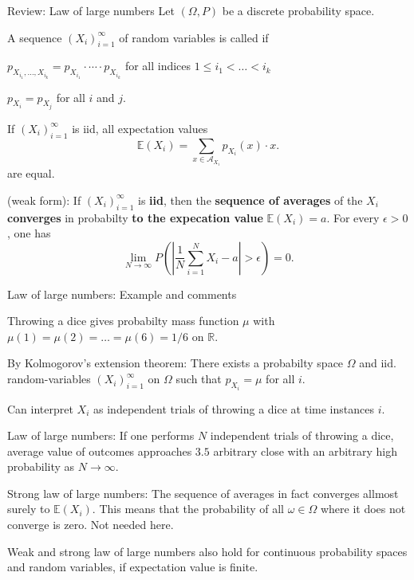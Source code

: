 \begin{frame}{Review: Law of large numbers}
Let $(\Omega,P)$ be a discrete probability space.
\bit
\item A sequence $(X_i)_{i=1}^\infty$ of random variables is called  if 
\bit
\item $p_{X_{i_1},\dots,X_{i_k}}=p_{X_{i_1}}\cdot \cdots \cdot p_{X_{i_k}} $ for all indices $1\leq i_1<\dots<i_k$
\item $p_{X_i}=p_{X_j}$ for all $i$ and $j$. 
\eit
\item  If $(X_i)_{i=1}^\infty$ is iid, all expectation values
\[
\mathbb{E}(X_i)=\sum_{x\in\mathcal{A}_{X_i}}p_{X_i}(x)\cdot x.
\]
are equal.   
\item {} (weak form): If $(X_i)_{i=1}^\infty$ is \textbf{iid}, then the \textbf{sequence 
of averages} of the $X_i$ \textbf{converges} in probabilty \textbf{to the expecation value} $\mathbb{E}(X_i)=a$.
For every $\epsilon>0$, one has 
\[
\lim_{N\to\infty}P\left(\left|\frac{1}{N}\sum_{i=1}^NX_i-a\right|>\epsilon\right)=0. 
\]
\eit 
\end{frame}

\begin{frame}{Law of large numbers: Example and comments}
\bit
\item Throwing a dice gives probabilty mass function $\mu$ with $\mu(1)=\mu(2)=\dots=\mu(6)=1/6$ on $\mathbb{R}$. 
\item By Kolmogorov's extension theorem: There exists a probabilty 
space $\Omega$ and iid. random-variables $(X_i)_{i=1}^\infty$ on $\Omega$ such that $p_{X_i}=\mu$ for all $i$. 
\item Can interpret $X_i$ as independent trials of throwing a dice at time instances $i$.
\item[\iarrow] Law of large numbers: If one performs $N$ independent trials of throwing a dice,  average value of outcomes approaches $3.5$ arbitrary close with an arbitrary high probability as $N\to\infty$. 
\eit 
{} 
\bit
\item Strong law of large numbers: The sequence of averages in fact converges allmost surely to $\mathbb{E}(X_i)$. This means that the probability of all $\omega\in\Omega$ where 
it does not converge is zero. Not needed here. 
\item Weak and strong law of large numbers also hold for continuous probability spaces and random variables, if expectation value is finite.
\eit
\end{frame}



